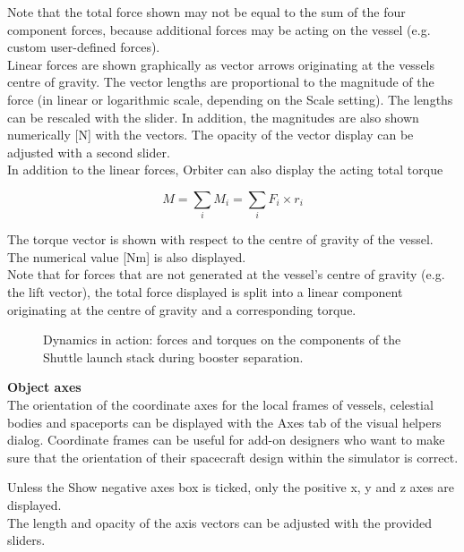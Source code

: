\documentclass[Orbiter User Manual.tex]{subfiles}
\begin{document}
\noindent
Note that the total force shown may not be equal to the sum of the four component forces, because additional forces may be acting on the vessel (e.g. custom user-defined forces).\\
Linear forces are shown graphically as vector arrows originating at the vessels centre of gravity. The vector lengths are proportional to the magnitude of the force (in linear or logarithmic scale, depending on the Scale setting). The lengths can be rescaled with the slider. In addition, the magnitudes are also shown numerically [N] with the vectors. The opacity of the vector display can be adjusted with a second slider.\\
In addition to the linear forces, Orbiter can also display the acting total torque

\[ M = \sum_{i} M_{i}= \sum_{i} F_{i} \times r_{i} \]

\noindent
The torque vector is shown with respect to the centre of gravity of the vessel. The numerical value [Nm] is also displayed.\\
Note that for forces that are not generated at the vessel's centre of gravity (e.g. the lift vector), the total force displayed is split into a linear component originating at the centre of gravity and a corresponding torque.

\begin{figure}[H]
	\centering
	\caption{Dynamics in action: forces and torques on the components of the Shuttle launch stack during booster separation.}
\end{figure}

\noindent
\textbf{Object axes}\\
The orientation of the coordinate axes for the local frames of vessels, celestial bodies and spaceports can be displayed with the Axes tab of the visual helpers dialog. Coordinate frames can be useful for add-on designers who want to make sure that the orientation of their spacecraft design within the simulator is correct.

\begin{figure}[H]
	\centering
\end{figure}

\noindent
Unless the Show negative axes box is ticked, only the positive x, y and z axes are displayed.\\
The length and opacity of the axis vectors can be adjusted with the provided sliders.
\end{document}

